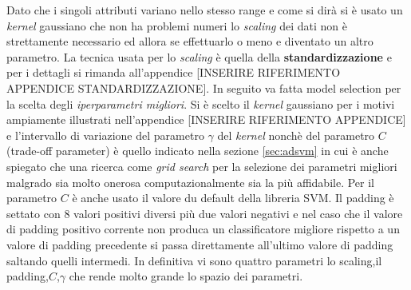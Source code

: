 Dato che i singoli attributi variano nello stesso range e come si dirà si è usato un \textit{kernel} gaussiano che non ha problemi numeri lo \textit{scaling} dei dati non è strettamente necessario ed allora se effettuarlo o meno e diventato un altro parametro. La tecnica usata per lo \textit{scaling} è quella della \textbf{standardizzazione} e per i dettagli si rimanda all'appendice [INSERIRE RIFERIMENTO APPENDICE STANDARDIZZAZIONE]. In seguito va fatta model selection per la scelta degli \textit{iperparametri migliori}. Si è scelto il \textit{kernel} gaussiano per i motivi ampiamente illustrati nell'appendice [INSERIRE RIFERIMENTO APPENDICE] e l'intervallo di variazione del parametro $\gamma$ del \textit{kernel} nonchè del parametro $C$(trade-off parameter) è quello indicato nella sezione \ref{sec:adsvm} in cui è anche spiegato che una ricerca come \textit{grid search} per la selezione dei parametri migliori malgrado sia molto onerosa computazionalmente sia la più affidabile.  Per il parametro $C$ è anche usato il valore du default della libreria \ac{SVM}. Il padding è settato con 8 valori positivi diversi più due valori negativi e nel caso che il valore di padding positivo corrente non produca un classificatore migliore rispetto a un valore di padding precedente si passa direttamente all'ultimo valore di padding saltando quelli intermedi. In definitiva vi sono quattro parametri lo scaling,il padding,$C$,$\gamma$ che rende molto grande lo spazio dei parametri.\\


